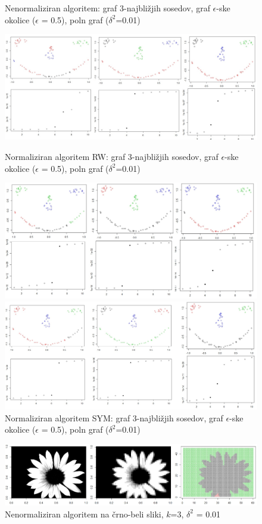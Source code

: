 \documentclass[a4paper, 10pt]{article}
\begin{document}
\begin{figure}[ht]
\caption{Nenormaliziran algoritem: graf 3-najbližjih sosedov, graf $\epsilon$-ske okolice ($\epsilon$ = 0.5), poln graf ($\delta^2$=0.01)}
\includegraphics[width=\textwidth]{unnorm-smiley}

\caption{Normaliziran algoritem RW: graf 3-najbližjih sosedov, graf $\epsilon$-ske okolice ($\epsilon$ = 0.5), poln graf ($\delta^2$=0.01)}
\includegraphics[width=\textwidth]{norm-smiley}

\caption{Normaliziran algoritem SYM: graf 3-najbližjih sosedov, graf $\epsilon$-ske okolice ($\epsilon$ = 0.5), poln graf ($\delta^2$=0.01)}
\includegraphics[width=\textwidth]{norm-smiley-sym}
\end{figure}


\begin{figure} [ht]
\caption{Nenormaliziran algoritem na črno-beli sliki, $k$=3, $\delta^2$ = 0.01}
\includegraphics[width=\textwidth]{roza}
\end{figure}
\end{document}
